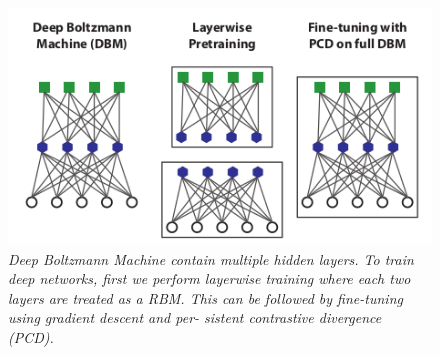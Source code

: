 \begin{figure}[h!]
	\centering
	\includegraphics[width=0.7\linewidth]{gfx/DBM}
	\caption{\itshape Deep Boltzmann Machine contain multiple hidden
		layers. To train deep networks, first we perform layerwise
		training where each two layers are treated as a RBM. This
		can be followed by fine-tuning using gradient descent and per-
		sistent contrastive divergence (PCD).}
	\label{fig:dbm}
\end{figure}








































 